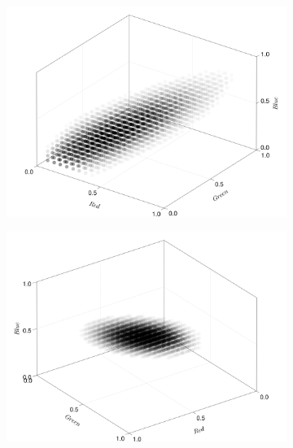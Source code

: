 \begin{figure}[ht!]
    \centering
    \begin{subfigure}[c]{0.3\textwidth}
        \centering
        \includegraphics[scale=0.09]{../figures/gaussian_cloud_kids_1}
    \end{subfigure}
    \begin{subfigure}[c]{0.3\textwidth}
        \centering
        \includegraphics[scale=0.09]{../figures/gaussian_cloud_kids_2}
    \end{subfigure}
    \begin{subfigure}[c]{0.3\textwidth}
        \centering

\end{subfigure}
\end{figure}
